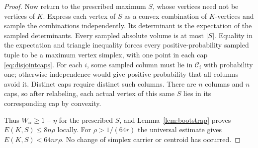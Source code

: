 \begin{proof}
Now return to the prescribed maximum $S$, whose vertices need not be
vertices of $K$. Express each vertex of $S$ as a convex combination of
$K$-vertices and sample the combinations independently. Its determinant is
the expectation of the sampled determinants. Every sampled absolute
volume is at most $|S|$. Equality in the expectation and triangle
inequality forces every positive-probability sampled tuple to be a maximum
vertex simplex, with one point in each cap \eqref{eq:disjointcaps}.
For each $i$, some sampled column must lie in $\mathcal C_i$ with probability
one; otherwise independence would give positive probability that all
columns avoid it. Distinct caps require distinct such columns. There are
$n$ columns and $n$ caps, so after relabeling, each actual vertex of this
same $S$ lies in its corresponding cap by convexity.

Thus $W_{ii}\ge1-\eta$ for the prescribed $S$, and
Lemma~\ref{lem:bootstrap} proves $E(K,S)\le8n\rho$ locally.
For $\rho>1/(64r)$ the universal estimate gives $E(K,S)<64nr\rho$.
No change of simplex carrier or centroid has occurred.
\end{proof}
